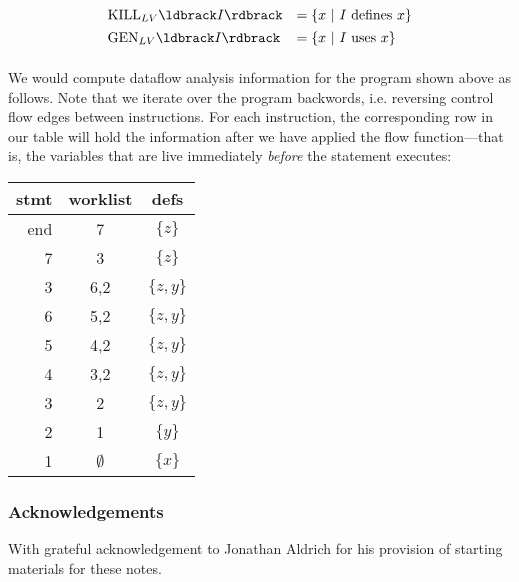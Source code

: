\documentclass[11pt]{article}
\newcommand{\parg}[1] %
  {\ldbrack #1 \rdbrack}
\def\tablespace{\vspace{2ex}}
\begin{document}
\[
\begin{array}{lll}

\mbox{KILL}_{LV}\parg{I} & = \{ x ~|~ I ~\mbox{defines}~x \}\\[1ex]

\mbox{GEN}_{LV}\parg{I}  & = \{ x ~|~ I ~\mbox{uses}~x \}\\[1ex]

\end{array}
\]

We would compute dataflow analysis information for the program shown above as follows.  Note that we iterate over the program backwords, i.e. reversing control flow edges between instructions.  For each instruction, the corresponding row in our table will hold the information after we have applied the flow function---that is, the variables that are live immediately \textit{before} the statement executes:

\tablespace
\begin{tabular}{r | c | c}

stmt & worklist & defs \\
\hline
end & 7   & $\{ z \}$ \\
7   & 3   & $\{ z \}$ \\
3   & 6,2 & $\{ z, y \}$ \\
6   & 5,2 & $\{ z, y \}$ \\
5   & 4,2 & $\{ z, y \}$ \\
4   & 3,2 & $\{ z, y \}$ \\
3   & 2   & $\{ z, y \}$ \\
2   & 1   & $\{ y \}$ \\
1   & $\emptyset$ & $\{ x \}$ \\

\end{tabular}
\tablespace


\subsubsection*{Acknowledgements}

With grateful acknowledgement to Jonathan Aldrich for his provision of starting
materials for these notes. 
\end{document}
